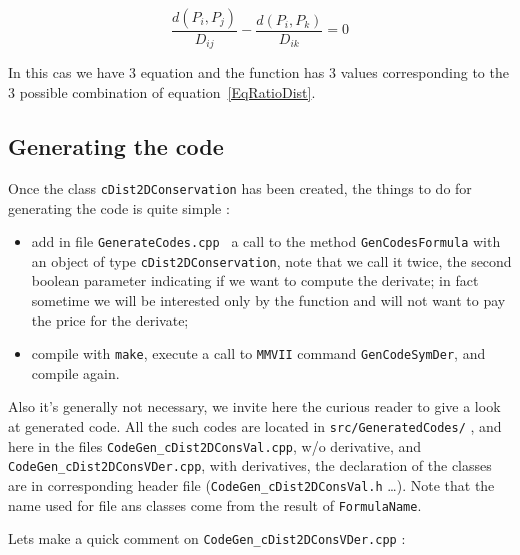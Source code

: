 \begin{equation}
      \frac{d(P_i,P_j)}{D_{ij}} - \frac{d(P_i,P_k)}{D_{ik}} = 0 \label{EqRatioDist}
\end{equation}

In this cas we have $3$ equation and the function has $3$  values corresponding to the
$3$ possible combination of  equation~\ref{EqRatioDist}.


\subsection{Generating the code}

Once the class {\tt cDist2DConservation} has been created, the things to do for generating the
code is quite simple :

\begin{itemize}
    \item   add in file  {\tt GenerateCodes.cpp } a call to   the method {\tt GenCodesFormula}
            with an object of type {\tt cDist2DConservation}, note that we call it twice,
            the second boolean parameter indicating if we want to  compute the derivate;
            in fact sometime we will be interested only by the function and will not want
            to pay the price for the derivate;


    \item   compile with {\tt make}, execute a call to {\tt MMVII} command {\tt GenCodeSymDer},
            and compile again.
\end{itemize}


Also it's generally not necessary, we invite here the curious reader to give a look
at generated code.  All the such codes are located in {\tt src/GeneratedCodes/} ,
and here in the files  {\tt CodeGen\_cDist2DConsVal.cpp}, w/o derivative, and 
{\tt CodeGen\_cDist2DConsVDer.cpp}, with derivatives, the declaration of the classes
are in corresponding header file ({\tt CodeGen\_cDist2DConsVal.h} \dots). 
Note that the name used for file ans classes come from the result of {\tt FormulaName}.

Lets make a quick comment on {\tt CodeGen\_cDist2DConsVDer.cpp} :

